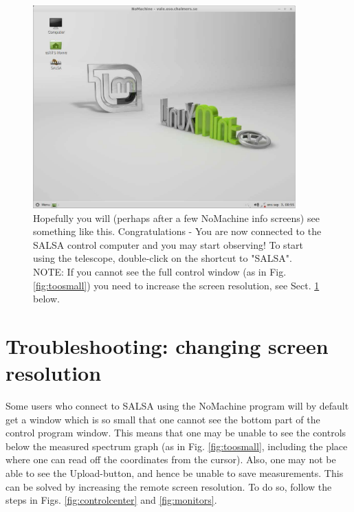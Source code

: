 \begin{figure}[H]
    \centering
	\includegraphics[width=0.9\textwidth]{../figures/nomachinefigs/fig9-connected.pdf}
    \caption{Hopefully you will (perhaps after a few NoMachine info screens)
see something like this. Congratulations - You are now connected to the SALSA
control computer and you may start observing! 
To start using the telescope, double-click on the shortcut to "SALSA".
NOTE: If you cannot see the full control window (as in Fig. \ref{fig:toosmall})
you need to increase the screen resolution, see Sect. \ref{sect:screenres}
below.} 
\label{fig:connected} 
\end{figure}

\section{Troubleshooting: changing screen resolution}
\label{sect:screenres}
Some users who connect to SALSA using the NoMachine program will by default get
a window which is so small that one cannot see the bottom part of the control
program window. This means that one may be unable to see the controls below the
measured spectrum graph (as in Fig. \ref{fig:toosmall}, including the place
where one can read off the coordinates from the cursor). Also, one may not be
able to see the Upload-button, and hence be unable to save measurements.  This
can be solved by increasing the remote screen resolution. To do so, follow the
steps in Figs. \ref{fig:controlcenter} and \ref{fig:monitors}.

